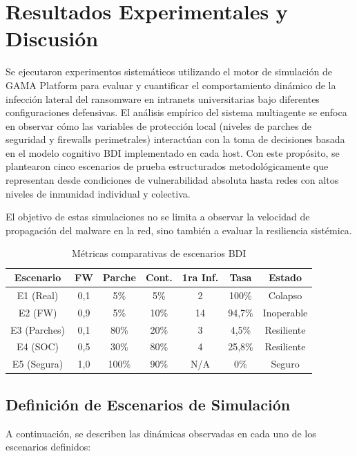 \section{Resultados Experimentales y Discusión}
\label{sec:resultados}

Se ejecutaron experimentos sistemáticos utilizando el motor de simulación de GAMA Platform para evaluar y cuantificar el comportamiento dinámico de la infección lateral del ransomware en intranets universitarias bajo diferentes configuraciones defensivas. El análisis empírico del sistema multiagente se enfoca en observar cómo las variables de protección local (niveles de parches de seguridad y firewalls perimetrales) interactúan con la toma de decisiones basada en el modelo cognitivo BDI implementado en cada host. Con este propósito, se plantearon cinco escenarios de prueba estructurados metodológicamente que representan desde condiciones de vulnerabilidad absoluta hasta redes con altos niveles de inmunidad individual y colectiva.

El objetivo de estas simulaciones no se limita a observar la velocidad de propagación del malware en la red, sino también a evaluar la resiliencia sistémica.

\begin{table}[htbp]
\caption{Métricas comparativas de escenarios BDI}
\label{tab:comparativo_escenarios}
\begin{center}
\footnotesize
\setlength{\tabcolsep}{2.5pt}
\begin{tabular}{|c|c|c|c|c|c|c|}
\hline
\textbf{Escenario} & \textbf{FW} & \textbf{Parche} & \textbf{Cont.} & \textbf{1ra Inf.} & \textbf{Tasa} & \textbf{Estado} \\ \hline
E1 (Real) & 0,1 & 5\% & 5\% & 2 & 100\% & Colapso \\ \hline
E2 (FW) & 0,9 & 5\% & 10\% & 14 & 94,7\% & Inoperable \\ \hline
E3 (Parches) & 0,1 & 80\% & 20\% & 3 & 4,5\% & Resiliente \\ \hline
E4 (SOC) & 0,5 & 30\% & 80\% & 4 & 25,8\% & Resiliente \\ \hline
E5 (Segura) & 1,0 & 100\% & 90\% & N/A & 0\% & Seguro \\ \hline
\end{tabular}
\end{center}
\end{table}

\subsection{Definición de Escenarios de Simulación}
A continuación, se describen las dinámicas observadas en cada uno de los escenarios definidos:

